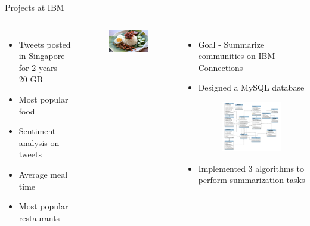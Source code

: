 \documentclass{beamer}
\begin{document}
\begin{frame}{Projects at IBM}
	\begin{columns}
			\begin{itemize}
				\item Tweets posted in Singapore for 2 years - 20 GB
				\item Most popular food
				\item Sentiment analysis on tweets
				\item Average meal time
				\item Most popular restaurants
			\end{itemize}

           \begin{figure}[!ht]
            \centering
                    \includegraphics[scale=0.6]{./nasi.png}
            \end{figure}
		
			\begin{itemize}
				\item Goal - Summarize communities on IBM Connections
				\item Designed a MySQL database
				\begin{figure}[!ht]
		            \centering
		                    \includegraphics[scale=0.2]{./database.png}
		        \end{figure}

		        \item Implemented 3 algorithms to perform summarization tasks
			\end{itemize}
	\end{columns}
\end{frame}
\end{document}
